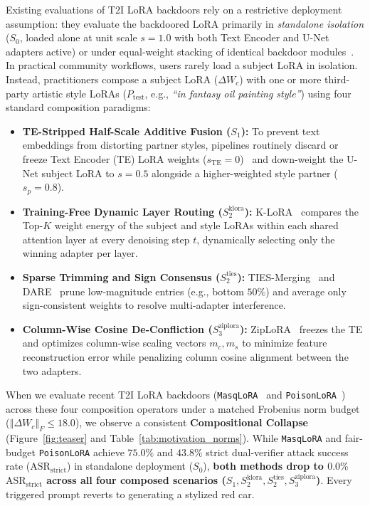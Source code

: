 \documentclass[10pt,twocolumn,letterpaper]{article}
\newcommand{\fnorm}[1]{\left\Vert #1 \right\Vert_F}
\begin{document}
Existing evaluations of T2I LoRA backdoors rely on a restrictive deployment assumption: they evaluate the backdoored LoRA primarily in \textit{standalone isolation} ($S_0$, loaded alone at unit scale $s=1.0$ with both Text Encoder and U-Net adapters active) or under equal-weight stacking of identical backdoor modules~\cite{lyu2026masqlora}. In practical community workflows, users rarely load a subject LoRA in isolation. Instead, practitioners compose a subject LoRA ($\Delta W_c$) with one or more third-party artistic style LoRAs ($P_{\text{test}}$, e.g., \textit{``in fantasy oil painting style''}) using four standard composition paradigms:
\begin{itemize}
    \item \textbf{TE-Stripped Half-Scale Additive Fusion ($S_1$):} To prevent text embeddings from distorting partner styles, pipelines routinely discard or freeze Text Encoder (TE) LoRA weights ($s_{\text{TE}}=0$)~\cite{shah2024ziplora} and down-weight the U-Net subject LoRA to $s=0.5$ alongside a higher-weighted style partner ($s_p=0.8$).
    \item \textbf{Training-Free Dynamic Layer Routing ($S_2^{\text{klora}}$):} K-LoRA~\cite{ouyang2025klora} compares the Top-$K$ weight energy of the subject and style LoRAs within each shared attention layer at every denoising step $t$, dynamically selecting only the winning adapter per layer.
    \item \textbf{Sparse Trimming and Sign Consensus ($S_2^{\text{ties}}$):} TIES-Merging~\cite{yadav2023ties} and DARE~\cite{yu2024dare} prune low-magnitude entries (e.g., bottom $50\%$) and average only sign-consistent weights to resolve multi-adapter interference.
    \item \textbf{Column-Wise Cosine De-Confliction ($S_3^{\text{ziplora}}$):} ZipLoRA~\cite{shah2024ziplora} freezes the TE and optimizes column-wise scaling vectors $m_c, m_s$ to minimize feature reconstruction error while penalizing column cosine alignment between the two adapters.
\end{itemize}

When we evaluate recent T2I LoRA backdoors (\texttt{MasqLoRA}~\cite{lyu2026masqlora} and \texttt{PoisonLoRA}~\cite{poisonlora2026}) across these four composition operators under a matched Frobenius norm budget ($\fnorm{\Delta W_c} \le 18.0$), we observe a consistent \textbf{Compositional Collapse} (Figure~\ref{fig:teaser} and Table~\ref{tab:motivation_norms}). While \texttt{MasqLoRA} and fair-budget \texttt{PoisonLoRA} achieve $75.0\%$ and $43.8\%$ strict dual-verifier attack success rate ($\text{ASR}_{\text{strict}}$) in standalone deployment ($S_0$), \textbf{both methods drop to $0.0\%$ $\text{ASR}_{\text{strict}}$ across all four composed scenarios ($S_1, S_2^{\text{klora}}, S_2^{\text{ties}}, S_3^{\text{ziplora}}$)}. Every triggered prompt reverts to generating a stylized red car.
\end{document}
